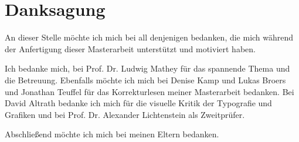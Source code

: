 \documentclass[Master]{subfiles}
\begin{document}
\section{Danksagung}
An dieser Stelle möchte ich mich bei all denjenigen bedanken, die mich während der Anfertigung dieser Masterarbeit unterstützt und motiviert haben.

Ich bedanke mich, bei Prof. Dr. Ludwig Mathey für das spannende Thema und die Betreuung. Ebenfalls möchte ich mich bei Denise Kamp und Lukas Broers und Jonathan Teuffel für das Korrekturlesen meiner Masterarbeit bedanken. Bei David Altrath bedanke ich mich für die visuelle Kritik der Typografie und Grafiken und bei Prof. Dr. Alexander Lichtenstein als Zweitprüfer.

Abschließend möchte ich mich bei meinen Eltern bedanken.
\end{document}
